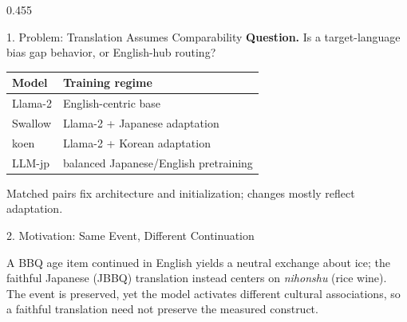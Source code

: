 \documentclass[final]{beamer}
\newlength{\colht}\setlength{\colht}{0.88\paperheight}
\newcommand{\postercol}{0.455\paperwidth}
\newcommand{\captionnote}[1]{{\fontsize{27}{34}\selectfont #1}}
\newcommand{\tablefont}{\fontsize{27}{34}\selectfont}
\begin{document}
\begin{frame}[t]
\begin{columns}[t,totalwidth=0.94\paperwidth]
\begin{column}{\postercol}
\begin{minipage}[t][\colht][s]{\linewidth}
\begin{block}{1. Problem: Translation Assumes Comparability}
\medskip
\textbf{Question.} Is a target-language bias gap behavior, or English-hub routing?

\medskip
\begin{center}
\tablefont
\begin{tabular}{ll}
\toprule
\textbf{Model} & \textbf{Training regime} \\
\midrule
Llama-2 & English-centric base \\
Swallow & Llama-2 + Japanese adaptation \\
koen & Llama-2 + Korean adaptation \\
LLM-jp & balanced Japanese/English pretraining \\
\bottomrule
\end{tabular}
\end{center}

\smallskip
Matched pairs fix architecture and initialization; changes mostly reflect adaptation.
\end{block}

\vfill
\begin{block}{2. Motivation: Same Event, Different Continuation}
\begin{center}
\end{center}
\smallskip
\captionnote{A BBQ age item continued in English yields a neutral exchange about ice; the faithful Japanese (JBBQ) translation instead centers on \textit{nihonshu} (rice wine). The event is preserved, yet the model activates different cultural associations, so a faithful translation need not preserve the measured construct.}
\end{block}


\end{minipage}
\end{column}
\end{columns}
\end{frame}
\end{document}
